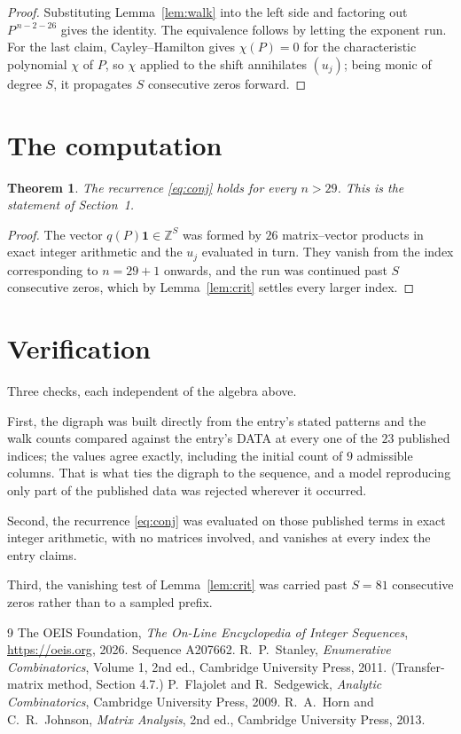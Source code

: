 \documentclass[11pt,a4paper]{article}
\theoremstyle{plain}
\newtheorem{theorem}{Theorem}
\theoremstyle{definition}
\begin{document}
\begin{proof}
Substituting Lemma~\ref{lem:walk} into the left side and factoring out
$P^{\,n-2-26}$ gives the identity. The equivalence follows by letting the exponent
run. For the last claim, Cayley--Hamilton gives $\chi(P)=0$ for the characteristic
polynomial $\chi$ of $P$, so $\chi$ applied to the shift annihilates $(u_j)$; being monic of
degree $S$, it propagates $S$ consecutive zeros forward.
\end{proof}

\section{The computation}

\begin{theorem}
The recurrence \eqref{eq:conj} holds for every $n>29$. This is the statement of
Section~1.
\end{theorem}

\begin{proof}
The vector $q(P)\mathbf{1}\in\mathbb{Z}^{S}$ was formed by $26$ matrix--vector
products in exact integer arithmetic and the $u_j$ evaluated in turn. They vanish from the
index corresponding to $n=29+1$ onwards, and the run was continued past $S$ consecutive
zeros, which by Lemma~\ref{lem:crit} settles every larger index.
\end{proof}

\section{Verification}

Three checks, each independent of the algebra above.

First, the digraph was built directly from the entry's stated patterns and the walk counts
compared against the entry's DATA at every one of the $23$ published indices; the
values agree exactly, including the initial count of $9$ admissible columns. That is
what ties the digraph to the sequence, and a model reproducing only part of the published
data was rejected wherever it occurred.

Second, the recurrence \eqref{eq:conj} was evaluated on those published terms in exact
integer arithmetic, with no matrices involved, and vanishes at every index the entry claims.

Third, the vanishing test of Lemma~\ref{lem:crit} was carried past $S=81$ consecutive
zeros rather than to a sampled prefix.

\begin{thebibliography}{9}
 The OEIS Foundation, \emph{The On-Line Encyclopedia of Integer
Sequences}, \url{https://oeis.org}, 2026. Sequence A207662.
 R.~P.~Stanley, \emph{Enumerative Combinatorics}, Volume 1, 2nd ed.,
Cambridge University Press, 2011. (Transfer-matrix method, Section 4.7.)
 P.~Flajolet and R.~Sedgewick, \emph{Analytic Combinatorics}, Cambridge
University Press, 2009.
 R.~A.~Horn and C.~R.~Johnson, \emph{Matrix Analysis}, 2nd ed., Cambridge
University Press, 2013.
\end{thebibliography}
\end{document}
